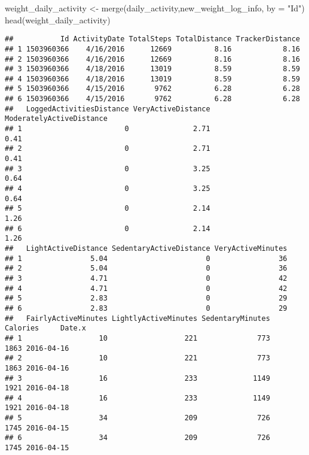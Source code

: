 \documentclass[
]{article}
\newenvironment{Shaded}{\begin{snugshade}}{\end{snugshade}}
\newcommand{\AttributeTok}[1]{\textcolor[rgb]{0.77,0.63,0.00}{#1}}
\newcommand{\FunctionTok}[1]{\textcolor[rgb]{0.00,0.00,0.00}{#1}}
\newcommand{\NormalTok}[1]{#1}
\newcommand{\OtherTok}[1]{\textcolor[rgb]{0.56,0.35,0.01}{#1}}
\newcommand{\StringTok}[1]{\textcolor[rgb]{0.31,0.60,0.02}{#1}}
\begin{document}
\begin{Shaded}
\begin{Highlighting}[]
\NormalTok{weight\_daily\_activity }\OtherTok{\textless{}{-}} \FunctionTok{merge}\NormalTok{(daily\_activity,new\_weight\_log\_info, }\AttributeTok{by =} \StringTok{"Id"}\NormalTok{)}
\FunctionTok{head}\NormalTok{(weight\_daily\_activity)}
\end{Highlighting}
\end{Shaded}

\begin{verbatim}
##           Id ActivityDate TotalSteps TotalDistance TrackerDistance
## 1 1503960366    4/16/2016      12669          8.16            8.16
## 2 1503960366    4/16/2016      12669          8.16            8.16
## 3 1503960366    4/18/2016      13019          8.59            8.59
## 4 1503960366    4/18/2016      13019          8.59            8.59
## 5 1503960366    4/15/2016       9762          6.28            6.28
## 6 1503960366    4/15/2016       9762          6.28            6.28
##   LoggedActivitiesDistance VeryActiveDistance ModeratelyActiveDistance
## 1                        0               2.71                     0.41
## 2                        0               2.71                     0.41
## 3                        0               3.25                     0.64
## 4                        0               3.25                     0.64
## 5                        0               2.14                     1.26
## 6                        0               2.14                     1.26
##   LightActiveDistance SedentaryActiveDistance VeryActiveMinutes
## 1                5.04                       0                36
## 2                5.04                       0                36
## 3                4.71                       0                42
## 4                4.71                       0                42
## 5                2.83                       0                29
## 6                2.83                       0                29
##   FairlyActiveMinutes LightlyActiveMinutes SedentaryMinutes Calories     Date.x
## 1                  10                  221              773     1863 2016-04-16
## 2                  10                  221              773     1863 2016-04-16
## 3                  16                  233             1149     1921 2016-04-18
## 4                  16                  233             1149     1921 2016-04-18
## 5                  34                  209              726     1745 2016-04-15
## 6                  34                  209              726     1745 2016-04-15

\end{verbatim}
\end{document}
